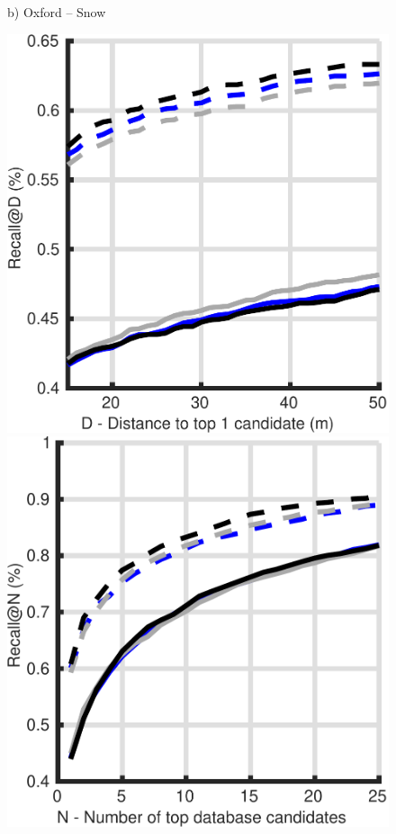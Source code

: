 \begin{figure}
\begin{minipage}{0.19\linewidth}
		b) Oxford -- Snow
	\end{minipage}
%		
%		
	\begin{minipage}{0.19\linewidth}
		\center \scriptsize
		\includegraphics[width=\linewidth]{plot/depth_vs_ref/Results_cmu_lt/distance}	
		
		\includegraphics[width=\linewidth]{plot/depth_vs_ref/Results_cmu_lt/recall}
		

\end{minipage}
\end{figure}
